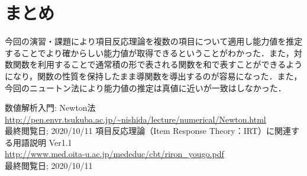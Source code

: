 \documentclass[12pt]{jarticle}
\begin{document}
\section{まとめ}
今回の演習・課題により項目反応理論を複数の項目について適用し能力値を推定することでより確からしい能力値が取得できるということがわかった．また，対数関数を利用することで通常積の形で表される関数を和で表すことができるようになり，関数の性質を保持したまま導関数を導出するのが容易になった．また，今回のニュートン法により能力値の推定は真値に近いが一致はしなかった．

\begin{thebibliography}{99}
    \label{sannkoubunnkenn_chapter}
    \bibitem{} 数値解析入門: Newton法\\
    \url{http://pen.envr.tsukuba.ac.jp/~nishida/lecture/numerical/Newton.html}\\
    最終閲覧日; 2020/10/11
    \bibitem{} 項目反応理論（Item Response Theory：IRT）に関連する用語説明 Ver1.1\\
    \url{http://www.med.oita-u.ac.jp/mededuc/cbt/riron_yougo.pdf}\\
    最終閲覧日; 2020/10/11
\end{thebibliography}

\end{document}
